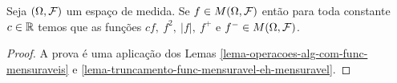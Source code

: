 \begin{corolario}
	Seja $(\Omega,\mathcal{F})$ um espaço de medida. Se $f\in M(\Omega,\mathcal{F})$
	então para toda constante $c\in \mathbb{R}$ temos que 
	as funções $cf,\ f^2,\ |f|,\ f^{+}$ e $f^{-}\in M(\Omega,\mathcal{F})$. 
\end{corolario} 

\begin{proof}
A prova é uma aplicação dos Lemas 
\ref{lema-operacoes-alg-com-func-mensuraveis} 
e
\ref{lema-truncamento-func-mensuravel-eh-mensuravel}.

\end{proof}

